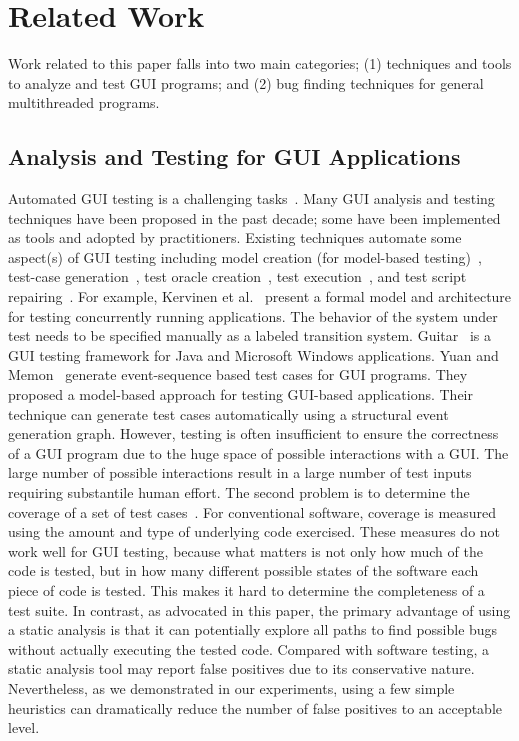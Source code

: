 \section{Related Work}

Work related to this paper falls into two main categories; (1)
techniques and tools to analyze and test GUI programs; and (2)
bug finding techniques for general multithreaded programs.

\subsection{Analysis and Testing for GUI Applications}

Automated GUI testing is a challenging tasks~\cite{Bertolino:2007:STR:1253532.1254712,
Harrold:2000:TR:336512.336532}.
 Many GUI analysis and testing techniques have been proposed in the past decade; some have been
implemented as tools and adopted by practitioners. Existing techniques automate
some aspect(s) of GUI testing including model creation
(for model-based testing)~\cite{androidtesting, Xie:2006:MTC:1172962.1172990},
test-case generation~\cite{YuanCohenMemonTSE2011, YuanMemonICSE2007},
test oracle creation~\cite{MemonFSE2000}, test execution~\cite{MemonFSE2001},
and test script repairing~\cite{Huang:2010:RGT:1828417.1828465, Daniel:2011:AGR:2002931.2002937}.
For example,
Kervinen et al.~\cite{Kervinen06model-basedtesting} present a formal model and architecture for testing
concurrently running applications. The behavior of the system under test
needs to be specified manually as a labeled transition system. 
Guitar~\cite{YuanCohenMemonTSE2011, YuanMemonICSE2007, Xie:2006:MTC:1172962.1172990}
is a GUI testing framework for Java and Microsoft Windows applications. 
Yuan and Memon~\cite{YuanMemonICSE2007} generate event-sequence based test cases for GUI
programs. They proposed a model-based approach for testing GUI-based applications.
Their technique can generate test cases automatically using a structural event
generation graph. 
However, testing is often insufficient to ensure the correctness of a GUI program
due to the huge space of possible interactions
with a GUI. The large number of possible interactions
result in a large number of
test inputs requiring substantile human effort.
The second
problem is to determine the coverage of a set of test
cases~\cite{MemonFSE2001}. For conventional software, coverage is measured
using the amount and type of underlying code exercised.
These measures do not work well for GUI testing, because
what matters is not only how much of the code is tested,
but in how many different possible states of the software
each piece of code is tested. This makes it hard to determine
the completeness of a test suite. 
In contrast, as advocated in this paper, the primary advantage of
using a static analysis is that it can potentially explore
all paths to find possible bugs without actually executing the tested code. 
Compared with software testing, a static analysis tool may
report false positives due to its conservative nature.
Nevertheless, as we demonstrated in our experiments, using a few simple heuristics
can dramatically reduce the number of false positives  to
an acceptable level.


